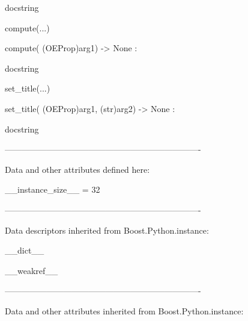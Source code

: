 \documentclass[letterpaper,10pt,english]{sphinxmanual}
\begin{document}
\begin{description}
\begin{description}
\begin{DUlineblock}{0em}
\begin{DUlineblock}{\DUlineblockindent}
\begin{DUlineblock}{\DUlineblockindent}
\item[] docstring
\item[] 
\end{DUlineblock}
\end{DUlineblock}
\item[] compute(...)
\item[]
\begin{DUlineblock}{\DUlineblockindent}
\item[] compute( (OEProp)arg1) -\textgreater{} None :
\item[]
\begin{DUlineblock}{\DUlineblockindent}
\item[] docstring
\item[] 
\end{DUlineblock}
\end{DUlineblock}
\item[] set\_title(...)
\item[]
\begin{DUlineblock}{\DUlineblockindent}
\item[] set\_title( (OEProp)arg1, (str)arg2) -\textgreater{} None :
\item[]
\begin{DUlineblock}{\DUlineblockindent}
\item[] docstring
\item[] 
\end{DUlineblock}
\end{DUlineblock}
\item[] ----------------------------------------------------------------------
\item[] Data and other attributes defined here:
\item[] 
\item[] \_\_instance\_size\_\_ = 32
\item[] 
\item[] ----------------------------------------------------------------------
\item[] Data descriptors inherited from Boost.Python.instance:
\item[] 
\item[] \_\_dict\_\_
\item[] 
\item[] \_\_weakref\_\_
\item[] 
\item[] ----------------------------------------------------------------------
\item[] Data and other attributes inherited from Boost.Python.instance:

\end{DUlineblock}
\end{description}
\end{description}
\end{document}
